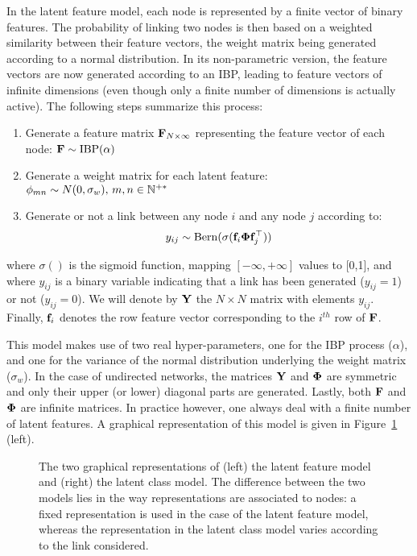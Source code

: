 In the latent feature model, each node is represented by a finite vector of binary features. The probability of linking two nodes is then based on a weighted similarity between their feature vectors, the weight matrix being generated according to a normal distribution. In its non-parametric version, the feature vectors are now generated according to an IBP, leading to feature vectors of infinite dimensions (even though only a finite number of dimensions is actually active). The following steps summarize this process:
%
\begin{enumerate}
\item Generate a feature matrix $\mathbf{F}_{N \times \infty}$ representing the feature vector of each node: $\mathbf{F} \sim \mathrm{IBP}(\alpha)$
\item Generate a weight matrix for each latent feature:\\
 $\mathbf{\phi}_{mn} \sim N(0, \sigma_w), \, m,n \in \mathbb{N}^{+*}$
\item Generate or not a link between any node $i$ and any node $j$ according to: 
%
\begin{equation}
y_{ij} \sim \mathrm{Bern}(\sigma(\mat{f}_{i} \mat{\Phi} \mat{f}_{j}^\top))
\label{eq:link-ilfm}
\end{equation}
\end{enumerate}
%
where $\sigma()$ is the sigmoid function, mapping $[-\infty, +\infty]$ values to [0,1], and where $y_{ij}$ is a binary variable indicating that a link has been generated ($y_{ij}=1$) or not ($y_{ij}=0$). We will denote by $\mathbf{Y}$ the $N \times N$ matrix with elements $y_{ij}$. Finally, $\mathbf{f}_{i}$ denotes the row feature vector corresponding to the $i^{th}$ row of $\mathbf{F}$.

This model makes use of two real hyper-parameters, one for the IBP process ($\alpha$), and one for the variance of the normal distribution underlying the weight matrix ($\sigma_w$). In the case of undirected networks, the matrices $\mathbf{Y}$ and $\mathbf{\Phi}$ are symmetric and only their upper (or lower) diagonal parts are generated. Lastly, both $\mathbf{F}$ and $\mathbf{\Phi}$ are infinite matrices. In practice however, one always deal with a finite number of latent features. A graphical representation of this model is given in Figure~\ref{fig:ilfrm} (left).

\begin{figure}[t]
	\centering
	\vspace{1cm}
	\scalebox{0.88}{
	}
	\endminipage
	\scalebox{0.88}{
		}
	\endminipage
	\caption{The two graphical representations of (left) the latent feature model and (right) the latent class model. The difference between the two models lies in the way representations are associated to nodes: a fixed representation is used in the case of the latent feature model, whereas the representation in the latent class model varies according to the link considered.}
	\label{fig:ilfrm}
\end{figure}

